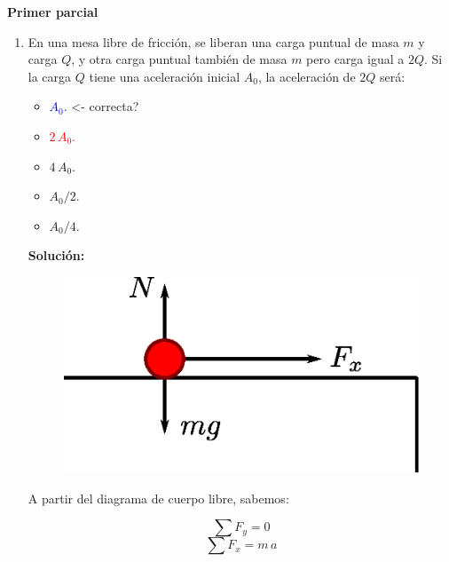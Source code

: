\documentclass[letter,11pt]{article}
\begin{document}
\begin{center}
    {\Large \bf{Primer parcial}}
\end{center}

\noindent{}

\vspace{0.5cm}

\begin{enumerate}
\item En una mesa libre de fricción, se liberan una carga puntual de masa $m$ y
carga $Q$, y otra carga puntual también de masa $m$ pero carga igual a $2Q$. Si
la carga $Q$ tiene una aceleración inicial $A_0$, la aceleración de $2Q$ será:

\begin{itemize}
    \item \textcolor{blue}{$A_0$.} <- correcta?
    \item \textcolor{red}{$2\,A_0$.}
    \item $4\,A_0$.
    \item $A_0/2$.
    \item $A_0/4$.
\end{itemize}

\textbf{Solución:}

\begin{figure}[!h]
\centering
\includegraphics[scale=0.39]{resources/a1.eps}
\end{figure}

A partir del diagrama de cuerpo libre, sabemos:

\begin{equation*}
    \sum F_y = 0
\end{equation*}
\begin{equation*}
    \sum F_x = m\,a
\end{equation*}


\end{enumerate}
\end{document}
